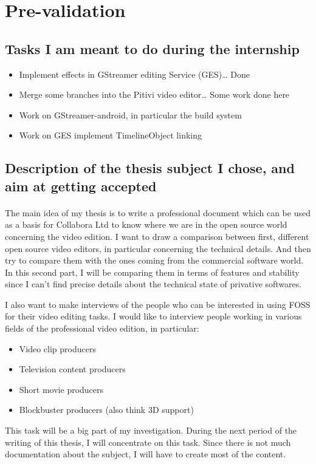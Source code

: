 \newpage
\section{Pre-validation}

\subsection{Tasks I am meant to do during the internship}

    \begin {itemize}
        \item {Implement effects in GStreamer editing Service (GES)\ldots
               Done}
        \item {Merge some branches into the Pitivi video editor\ldots
               Some work done here}
        \item {Work on GStreamer-android, in particular the build system}
        \item {Work on GES implement TimelineObject linking}
    \end {itemize}

\subsection{Description of the thesis subject I chose, and aim at getting
            accepted}

  \paragraph{}
      The main idea of my thesis is to write a professional document which can
      be used as a basis for Collabora Ltd to know where we are in the open
      source world concerning the video edition. I want to draw a comparison
      between first, different open source video editors, in particular concerning the
      technical details. And then try to compare them with the ones coming
      from the commercial software world. In this second part, I will be
      comparing them in terms of features and stability since I can't
      find precise details about the technical state of privative softwares.

      I also want to make interviews of the people who can be interested in
      using FOSS for their video editing tasks. I would like to interview
      people working in various fields of the professional video edition,
      in particular:
      \begin{itemize}
        \item {Video clip producers}
        \item {Television content producers}
        \item {Short movie producers}
        \item {Blockbuster producers (also think 3D support)}
      \end{itemize}
      This task will be a big part of my investigation. During the next period
      of the writing of this thesis, I will concentrate on this task. Since
      there is not much documentation about the subject, I will have to create
      most of the content.

